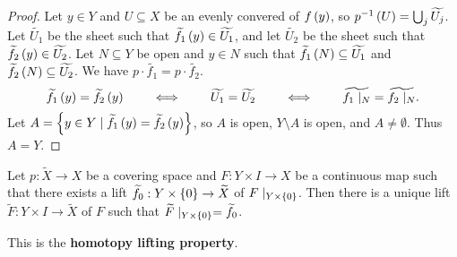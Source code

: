 \begin{proof}
Let $ y \in Y $ and $ U \subseteq X $ be an evenly convered of $ f\left( y \right) $, so $ p^{-1}\left( U \right) = \bigcup_j \widetilde{U_j} $. Let $ \widetilde{U_1} $ be the sheet such that $ \widetilde{f_1}\left( y \right) \in \widetilde{U_1} $, and let $ \widetilde{U_2} $ be the sheet such that $ \widetilde{f_2}\left( y \right) \in \widetilde{U_2} $. Let $ N \subseteq Y $ be open and $ y \in N $ such that $ \widetilde{f_1}\left( N \right) \subseteq \widetilde{U_1} $ and $ \widetilde{f_2}\left( N \right) \subseteq \widetilde{U_2} $. We have $ p \cdot \widetilde{f_1} = p \cdot \widetilde{f_2} $.
$$ \widetilde{f_1}\left( y \right) = \widetilde{f_2}\left( y \right) \qquad \iff \qquad \widetilde{U_1} = \widetilde{U_2} \qquad \iff \qquad \widetilde{f_1 \mid_N} = \widetilde{f_2 \mid_N}. $$
Let $ A = \left\{ y \in Y \mid \widetilde{f_1}\left( y \right) = \widetilde{f_2}\left( y \right) \right\} $, so $ A $ is open, $ Y \setminus A $ is open, and $ A \ne \emptyset $. Thus $ A = Y $.
\end{proof}

\begin{proposition}
\label{prop:1.30}
Let $ p : \widetilde{X} \to X $ be a covering space and $ F : Y \times I \to X $ be a continuous map such that there exists a lift $ \widetilde{f_0} : Y \times \left\{ 0 \right\} \to \widetilde{X} $ of $ F \mid_{Y \times \left\{ 0 \right\}} $. Then there is a unique lift $ \widetilde{F} : Y \times I \to \widetilde{X} $ of $ F $ such that $ \widetilde{F} \mid_{Y \times \left\{ 0 \right\}} = \widetilde{f_0} $.
\end{proposition}

This is the \textbf{homotopy lifting property}.

